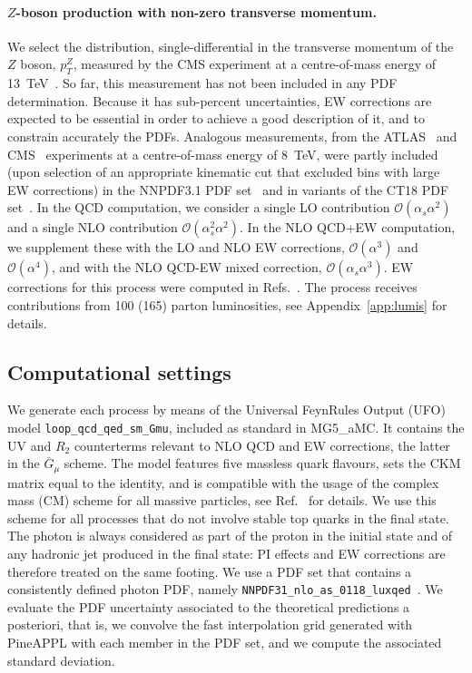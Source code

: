 \paragraph{$Z$-boson production with non-zero transverse momentum.}
We select the distribution, single-differential in the transverse momentum of
the $Z$ boson, $p_T^Z$, measured by the CMS experiment at a centre-of-mass
energy of 13~TeV~\cite{Sirunyan:2019bzr}. So far, this measurement has not been
included in any PDF determination. Because it has sub-percent uncertainties,
EW corrections are expected to be essential in order to achieve a good
description of it, and to constrain accurately the PDFs. Analogous measurements,
from the ATLAS~\cite{Aad:2015auj} and CMS~\cite{Khachatryan:2015oaa}
experiments at a centre-of-mass energy of 8~TeV, were partly included (upon
selection of an appropriate kinematic cut that excluded bins with large EW
corrections) in the NNPDF3.1 PDF set~\cite{Ball:2017nwa} and in variants of
the CT18 PDF set~\cite{Hou:2019efy}. In the QCD computation, we consider a
single LO contribution $\mathcal{O}(\alpha_s\alpha^2)$ and a single NLO
contribution $\mathcal{O}(\alpha_s^2\alpha^2)$. In the NLO QCD+EW computation,
we supplement these with the LO and NLO EW corrections,
$\mathcal{O}(\alpha^3)$ and $\mathcal{O}(\alpha^4)$, and with the NLO
QCD-EW mixed correction, $\mathcal{O}(\alpha_s\alpha^3)$. EW corrections for
this process were computed in
Refs.~\cite{Kuhn:2005az,Denner:2011vu,Hollik:2015pja,Kallweit:2015dum}.
The process receives contributions from 100 (165) parton luminosities,
see Appendix~\ref{app:lumis} for details.

\subsection{Computational settings}
\label{subsec:computational_settings}

We generate each process by means of the Universal FeynRules Output
(UFO)~\cite{Degrande:2011ua} model {\tt loop\_qcd\_qed\_sm\_Gmu},
included as standard in {\sc MG5\_aMC}. It contains the UV and $R_2$
counterterms relevant to NLO QCD and EW corrections, the latter in the
$\overline{G}_\mu$ scheme. The model features five massless quark flavours,
sets the CKM matrix equal to the identity, and is compatible with the usage of
the complex mass (CM) scheme for all massive particles, see
Ref.~\cite{Frederix:2018nkq} for details. We use this scheme
for all processes that do not involve stable top quarks in the final state.
The photon is always considered as part of the proton in the initial state and
of any hadronic jet produced in the final state: PI effects and EW corrections
are therefore treated on the same footing. We use a PDF set that contains a
consistently defined photon PDF, namely
{\tt NNPDF31\_nlo\_as\_0118\_luxqed}~\cite{Bertone:2017bme}. We evaluate the PDF
uncertainty associated to the theoretical predictions a posteriori, that is,
we convolve the fast interpolation grid generated with {\sc PineAPPL} with
each member in the PDF set, and we compute the associated standard deviation.


